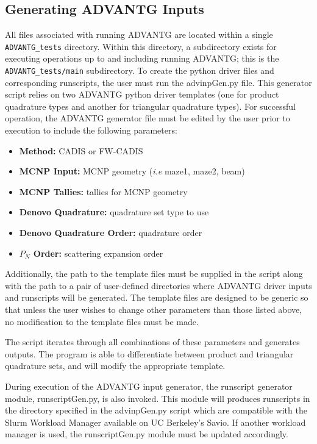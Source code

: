 \documentclass[10pt]{article}
\begin{document}
\subsection{Generating ADVANTG Inputs}
    All files associated with running ADVANTG are located within a single \texttt{ADVANTG\_tests} directory. Within this directory, a subdirectory exists for executing operations up to and including running ADVANTG; this is the \texttt{ADVANTG\_tests/main} subdirectory.
    To create the python driver files and corresponding runscripts, the user must run the advinpGen.py file. This generator script relies on two ADVANTG python driver templates (one for product quadrature types and another for triangular quadrature types). For successful operation, the ADVANTG generator file must be edited by the user prior to execution to include the following parameters:
    \begin{itemize}
        \item \textbf{Method: } CADIS or FW-CADIS
        \item \textbf{MCNP Input: } MCNP geometry (\textit{i.e} maze1, maze2, beam)
        \item \textbf{MCNP Tallies: } tallies for MCNP geometry
        \item \textbf{Denovo Quadrature: } quadrature set type to use
        \item \textbf{Denovo Quadrature Order: } quadrature order
        \item \textbf{$P_N$ Order: } scattering expansion order
    \end{itemize}
    
    Additionally, the path to the template files must be supplied in the script along with the path to a pair of user-defined directories where ADVANTG driver inputs and runscripts will be generated. The template files are designed to be generic so that unless the user wishes to change other parameters than those listed above, no modification to the template files must be made.
    
    The script iterates through all combinations of these parameters and generates outputs. The program is able to differentiate between product and triangular quadrature sets, and will modify the appropriate template. 
    
    During execution of the ADVANTG input generator, the runscript generator module, runscriptGen.py, is also invoked. This module will produces runscripts in the directory specified in the advinpGen.py script which are compatible with the Slurm Workload Manager available on UC Berkeley's Savio. If another workload manager is used, the runscriptGen.py module must be updated accordingly. 
    
\end{document}
